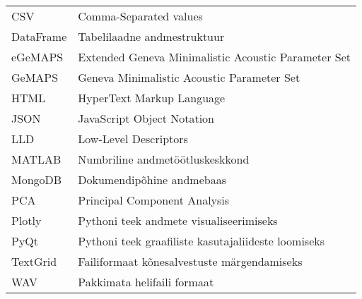 \begin{longtable}{p{3cm}p{10cm}}
CSV&Comma-Separated values\\
DataFrame&Tabelilaadne andmestruktuur\\
eGeMAPS&Extended Geneva Minimalistic Acoustic Parameter Set\\
GeMAPS&Geneva Minimalistic Acoustic Parameter Set\\
HTML&HyperText Markup Language\\
JSON&JavaScript Object Notation\\
LLD&Low-Level Descriptors\\
MATLAB&Numbriline andmetöötluskeskkond\\
MongoDB&Dokumendipõhine andmebaas\\
PCA&Principal Component Analysis\\
Plotly&Pythoni teek andmete visualiseerimiseks\\
PyQt&Pythoni teek graafiliste kasutajaliideste loomiseks\\
TextGrid&Failiformaat kõnesalvestuste märgendamiseks\\
WAV&Pakkimata helifaili formaat\\

\end{longtable}
\addtocounter{table}{-1} 
